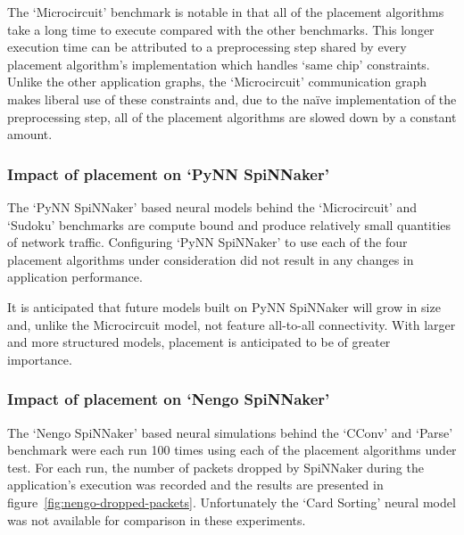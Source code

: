 				The `Microcircuit' benchmark is notable in that all of the placement
				algorithms take a long time to execute compared with the other
				benchmarks. This longer execution time can be attributed to a
				preprocessing step shared by every placement algorithm's implementation
				which handles `same chip' constraints. Unlike the other application
				graphs, the `Microcircuit' communication graph makes liberal use of
				these constraints and, due to the na\"ive implementation of the
				preprocessing step, all of the placement algorithms are slowed down by
				a constant amount.
			
			\subsubsection{Impact of placement on `PyNN SpiNNaker'}
				
				The `PyNN SpiNNaker' based neural models behind the `Microcircuit' and
				`Sudoku' benchmarks are compute bound and produce relatively small
				quantities of network traffic. Configuring `PyNN SpiNNaker' to use each
				of the four placement algorithms under consideration did not result in
				any changes in application performance.
				
				It is anticipated that future models built on PyNN SpiNNaker will grow
				in size and, unlike the Microcircuit model, not feature all-to-all
				connectivity. With larger and more structured models, placement is
				anticipated to be of greater importance.
			
			\subsubsection{Impact of placement on `Nengo SpiNNaker'}
				
				The `Nengo SpiNNaker' based neural simulations behind the `CConv' and
				`Parse' benchmark were each run \num{100} times using each of the
				placement algorithms under test. For each run, the number of packets
				dropped by SpiNNaker during the application's execution was recorded
				and the results are presented in
				figure~\ref{fig:nengo-dropped-packets}. Unfortunately the `Card
				Sorting' neural model was not available for comparison in these
				experiments.
				
